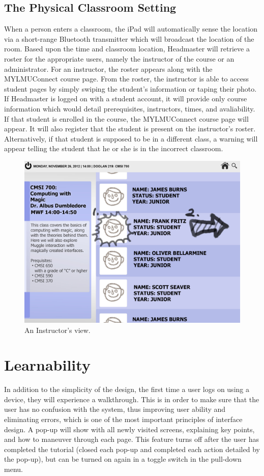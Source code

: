 \documentclass[12pt onesided letterpaper]{article}
\begin{document}
\subsection*{The Physical Classroom Setting}
When a person enters a classroom, the iPad will automatically sense the location via a short-range Bluetooth transmitter which will broadcast the location of the room.  Based upon the time and classroom location, Headmaster will retrieve a roster for the appropriate users, namely the instructor of the course or an administrator.  For an instructor, the roster appears along with the MYLMUConnect course page.  From the roster, the instructor is able to access student pages by simply swiping the student's information or taping their photo.  If Headmaster is logged on with a student account, it will provide only course information which would detail prerequisites, instructors, times, and avaliability. If that student is enrolled in the course, the MYLMUConnect course page will appear. It will also register that the student is present on the instructor's roster. Alternatively, if that student is supposed to be in a different class, a warning will appear telling the student that he or she is in the incorrect classroom.  
\\
\begin{figure}[h!]
  \caption{An Instructor's view.}
  \centering
    \includegraphics[width=\textwidth]{DESK}
\end{figure}
 

\section*{Learnability}
In addition to the simplicity of the design, the first time a user logs on using a device, they will experience a walkthrough.  This is in order to make sure that the user has no confusion with the system, thus improving user ability and eliminating errors, which is one of the most important principles of interface design. \cite{dondi12}   A pop-up will show with all newly visited screens, explaining key points, and how to maneuver through each page.  This feature turns off after the user has completed the tutorial (closed each pop-up and completed each action detailed by the pop-up), but can be turned on again in a toggle switch in the pull-down menu.  
\end{document}

